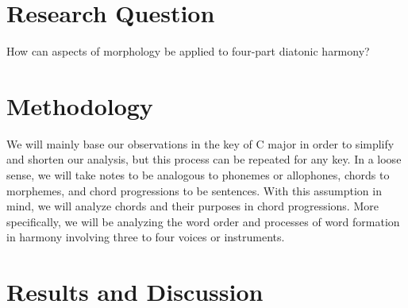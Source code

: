 \documentclass[12pt]{article}
\begin{document}
    \section*{Research Question}
    {\centering
        How can aspects of morphology be applied to four-part diatonic
        harmony?\par
    }
    \section*{Methodology}
    We will mainly base our observations in the key of C major in order to
    simplify and shorten our analysis, but this process can be repeated for
    any key. In a loose sense, we will take notes to be analogous to phonemes
    or allophones, chords to morphemes, and chord progressions to be
    sentences. With this assumption in mind, we will analyze chords and their
    purposes in chord progressions. More specifically, we will be analyzing
    the word order and processes of word formation in harmony involving
    three to four voices or instruments.
    \section*{Results and Discussion}
\end{document}
